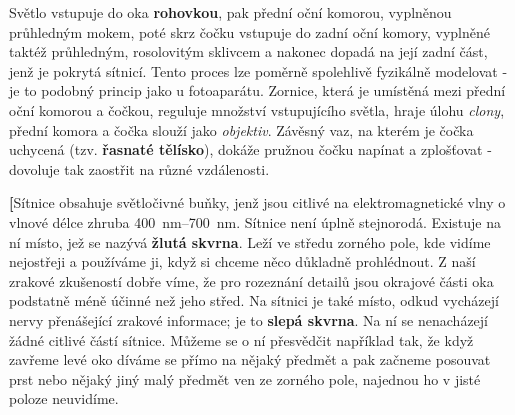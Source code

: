 
    Světlo vstupuje do oka \textbf{rohovkou}, pak přední oční komorou, vyplněnou průhledným mokem,
    poté skrz čočku vstupuje do zadní oční komory, vyplněné taktéž průhledným, rosolovitým sklivcem
    a nakonec dopadá na její zadní část, jenž je pokrytá sítnicí. Tento proces lze poměrně
    spolehlivě fyzikálně modelovat - je to podobný princip jako u fotoaparátu. Zornice, která je
    umístěná mezi přední oční komorou a čočkou, reguluje množství vstupujícího světla, hraje úlohu
    \emph{clony}, přední komora a čočka slouží jako \emph{objektiv}. Závěsný vaz, na kterém je čočka
    uchycená (tzv. \textbf{řasnaté tělísko}), dokáže pružnou čočku napínat a zplošťovat - dovoluje
    tak zaostřit na různé vzdálenosti.
    
    \textbf[{Sítnice} obsahuje světločivné buňky, jenž jsou citlivé na elektromagnetické vlny o
    vlnové délce zhruba \SIrange{400}{700}{\nm}. Sítnice není úplně stejnorodá. Existuje na ní
    místo, jež se nazývá \textbf{žlutá skvrna}. Leží ve středu zorného pole, kde vidíme nejostřeji a
    používáme ji, když si chceme něco důkladně prohlédnout. Z naší zrakové zkušeností dobře víme, že
    pro rozeznání detailů jsou okrajové části oka podstatně méně účinné než jeho střed. Na sítnici
    je také místo, odkud vycházejí nervy přenášející zrakové informace; je to \textbf{slepá skvrna}.
    Na ní se nenacházejí žádné citlivé částí sítnice. Můžeme se o ní přesvědčit například tak, že
    když zavřeme levé oko díváme se přímo na nějaký předmět a pak začneme posouvat prst nebo nějaký
    jiný malý předmět ven ze zorného pole, najednou ho v jisté poloze neuvidíme.
    

